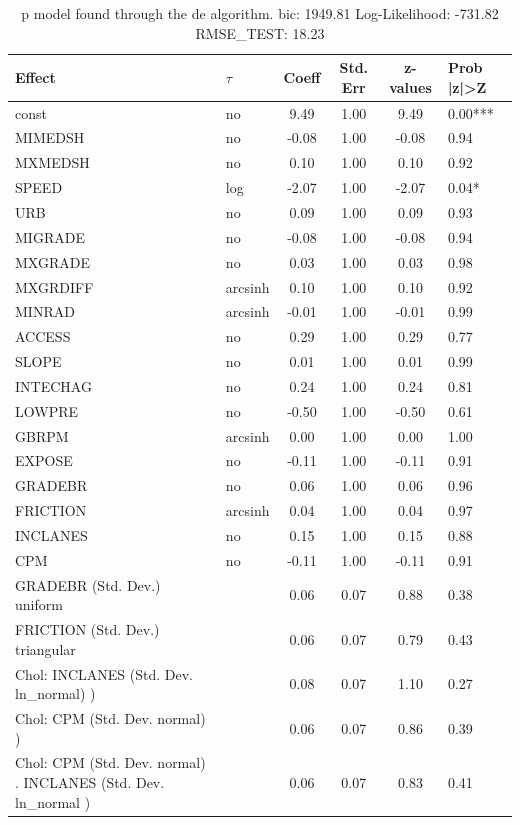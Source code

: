 \begin{table}
	\caption{p model found through the de algorithm. bic: 1949.81 Log-Likelihood: -731.82 RMSE_TEST: 18.23}
	\begin{center}
		\begin{tabular}{|l|l|c|c|c|l|}
			\hline
			Effect & $\tau$ & Coeff & Std. Err & z-values & Prob |z|>Z \\
			\hline
			const & no & 9.49 & 1.00 & 9.49 & 0.00*** \\
			\hline
			MIMEDSH & no & -0.08 & 1.00 & -0.08 & 0.94 \\
			\hline
			MXMEDSH & no & 0.10 & 1.00 & 0.10 & 0.92 \\
			\hline
			SPEED & log & -2.07 & 1.00 & -2.07 & 0.04* \\
			\hline
			URB & no & 0.09 & 1.00 & 0.09 & 0.93 \\
			\hline
			MIGRADE & no & -0.08 & 1.00 & -0.08 & 0.94 \\
			\hline
			MXGRADE & no & 0.03 & 1.00 & 0.03 & 0.98 \\
			\hline
			MXGRDIFF & arcsinh & 0.10 & 1.00 & 0.10 & 0.92 \\
			\hline
			MINRAD & arcsinh & -0.01 & 1.00 & -0.01 & 0.99 \\
			\hline
			ACCESS & no & 0.29 & 1.00 & 0.29 & 0.77 \\
			\hline
			SLOPE & no & 0.01 & 1.00 & 0.01 & 0.99 \\
			\hline
			INTECHAG & no & 0.24 & 1.00 & 0.24 & 0.81 \\
			\hline
			LOWPRE & no & -0.50 & 1.00 & -0.50 & 0.61 \\
			\hline
			GBRPM & arcsinh & 0.00 & 1.00 & 0.00 & 1.00 \\
			\hline
			EXPOSE & no & -0.11 & 1.00 & -0.11 & 0.91 \\
			\hline
			GRADEBR & no & 0.06 & 1.00 & 0.06 & 0.96 \\
			\hline
			FRICTION & arcsinh & 0.04 & 1.00 & 0.04 & 0.97 \\
			\hline
			INCLANES & no & 0.15 & 1.00 & 0.15 & 0.88 \\
			\hline
			CPM & no & -0.11 & 1.00 & -0.11 & 0.91 \\
			\hline
			GRADEBR (Std. Dev.) uniform &  & 0.06 & 0.07 & 0.88 & 0.38 \\
			\hline
			FRICTION (Std. Dev.) triangular &  & 0.06 & 0.07 & 0.79 & 0.43 \\
			\hline
			 Chol: INCLANES (Std. Dev. ln_normal) ) &  & 0.08 & 0.07 & 1.10 & 0.27 \\
			\hline
			 Chol: CPM (Std. Dev. normal) ) &  & 0.06 & 0.07 & 0.86 & 0.39 \\
			\hline
			 Chol: CPM (Std. Dev. normal) . INCLANES (Std. Dev.   ln_normal ) &  & 0.06 & 0.07 & 0.83 & 0.41 \\
			\hline
		\end{tabular}
	\end{center}
\end{table}